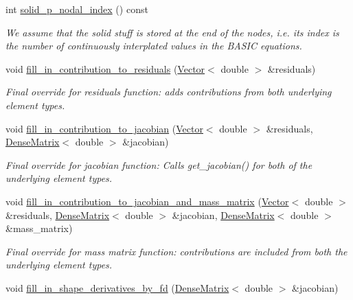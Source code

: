 \begin{DoxyCompactItemize}
int \hyperlink{classoomph_1_1RefineablePseudoSolidNodeUpdateElement_a511ebac2f17e098f4a01949d9d42be2d}{solid\+\_\+p\+\_\+nodal\+\_\+index} () const
\begin{DoxyCompactList}\small\item\em We assume that the solid stuff is stored at the end of the nodes, i.\+e. its index is the number of continuously interplated values in the B\+A\+S\+IC equations. \end{DoxyCompactList}\item 
void \hyperlink{classoomph_1_1RefineablePseudoSolidNodeUpdateElement_a36add3ef201fc05954ab982a67840cb3}{fill\+\_\+in\+\_\+contribution\+\_\+to\+\_\+residuals} (\hyperlink{classoomph_1_1Vector}{Vector}$<$ double $>$ \&residuals)
\begin{DoxyCompactList}\small\item\em Final override for residuals function\+: adds contributions from both underlying element types. \end{DoxyCompactList}\item 
void \hyperlink{classoomph_1_1RefineablePseudoSolidNodeUpdateElement_a56a4edc264874dc8673dccd92672b608}{fill\+\_\+in\+\_\+contribution\+\_\+to\+\_\+jacobian} (\hyperlink{classoomph_1_1Vector}{Vector}$<$ double $>$ \&residuals, \hyperlink{classoomph_1_1DenseMatrix}{Dense\+Matrix}$<$ double $>$ \&jacobian)
\begin{DoxyCompactList}\small\item\em Final override for jacobian function\+: Calls get\+\_\+jacobian() for both of the underlying element types. \end{DoxyCompactList}\item 
void \hyperlink{classoomph_1_1RefineablePseudoSolidNodeUpdateElement_a7ac165866aa2c717fb47df9ea1883d32}{fill\+\_\+in\+\_\+contribution\+\_\+to\+\_\+jacobian\+\_\+and\+\_\+mass\+\_\+matrix} (\hyperlink{classoomph_1_1Vector}{Vector}$<$ double $>$ \&residuals, \hyperlink{classoomph_1_1DenseMatrix}{Dense\+Matrix}$<$ double $>$ \&jacobian, \hyperlink{classoomph_1_1DenseMatrix}{Dense\+Matrix}$<$ double $>$ \&mass\+\_\+matrix)
\begin{DoxyCompactList}\small\item\em Final override for mass matrix function\+: contributions are included from both the underlying element types. \end{DoxyCompactList}\item 
void \hyperlink{classoomph_1_1RefineablePseudoSolidNodeUpdateElement_ac7a9338e59678df2d5e9fcf838bd95d1}{fill\+\_\+in\+\_\+shape\+\_\+derivatives\+\_\+by\+\_\+fd} (\hyperlink{classoomph_1_1DenseMatrix}{Dense\+Matrix}$<$ double $>$ \&jacobian)

\end{DoxyCompactItemize}

